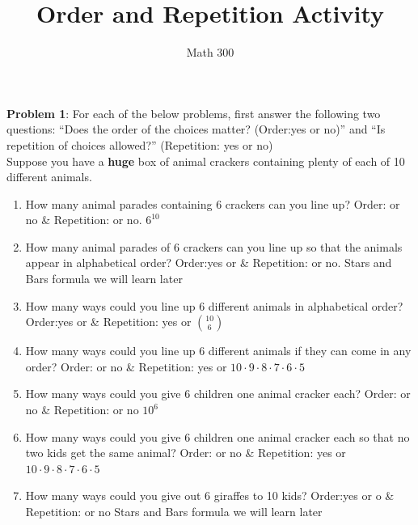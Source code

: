\documentclass[11pt]{amsart}
\title{Order and Repetition Activity}
\author{Math 300}
\begin{document}
\maketitle


{\bf Problem 1}: For each of the below problems, first answer the following two questions:  ``Does the order of the choices matter? (Order:yes or no)''  and ``Is repetition of choices allowed?'' (Repetition: yes or no)\\

Suppose you have a {\bf huge} box of animal crackers containing plenty of each of 10 different animals. 

\begin{enumerate}
\item  How many animal parades containing 6 crackers can you line up? Order:  or no \& Repetition:   or no. $6^10$\\
\item How many animal parades of 6 crackers can you line up so that the animals appear in alphabetical order? Order:yes or   \& Repetition:   or no. Stars and Bars formula we will learn later\\
\item  How many ways could you line up 6 different animals in alphabetical order? Order:yes or   \& Repetition: yes or   $\binom{10}{6}$\\
\item  How many ways could you line up 6 different animals if they can come in any order? Order:  or no \& Repetition: yes or   $10\cdot 9 \cdot 8 \cdot 7 \cdot 6 \cdot 5$\\
\item  How many ways could you give 6 children one animal cracker each? Order:  or no \& Repetition:   or no $10^6$\\
\item  How many ways could you give 6 children one animal cracker each so that no two kids get the same animal? Order:  or no \& Repetition: yes or   $10\cdot 9 \cdot 8 \cdot 7 \cdot 6 \cdot 5$\\
\item  How many ways could you give out 6 giraffes to 10 kids? Order:yes or o \& Repetition:  or no Stars and Bars formula we will learn later\\
\end{enumerate}
\end{document}
